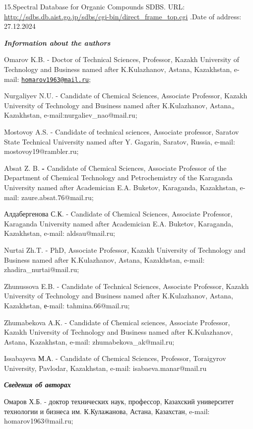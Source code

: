 15.Spectral Database for Organic Compounds SDBS. URL:
\url{http://sdbs.db.aist.go.jp/sdbs/cgi-bin/direct_frame_top.cgi} .Date
of address: 27.12.2024

\emph{{\bfseries Information about the authors}}

Omarov K.B. - Doctor of Technical Sciences, Professor, Kazakh University
of Technology and Business named after K.Kulazhanov, Astana, Kazakhstan,
e-mail:
\href{mailto:homarov1963@mail.ru}{\nolinkurl{homarov1963@mail.ru}};

Nurgaliyev N.U. - Candidate of Chemical Sciences, Associate Professor,
Kazakh University of Technology and Business named after K.Kulazhanov,
Astana„ Kazakhstan, e-mail:nurgaliev\_nao@mail.ru;

Mostovoy A.S. - Candidate of technical sciences, Associate professor,
Saratov State Technical University named after Y. Gagarin, Saratov,
Russia, e-mail: mostovoy19@rambler.ru;

Absat Z. B. {\bfseries -} Candidate of Chemical Sciences, Associate
Professor of the Department of Chemical Technology and Petrochemistry of
the Karaganda University named after Academician E.A. Buketov,
Karaganda, Kazakhstan, e-mail: zaure.absat.76@mail.ru;

Алдабергенова С.К. - Candidate of Chemical Sciences, Associate
Professor, Karaganda University named after Academician E.A. Buketov,
Karaganda, Kazakhstan, e-mail: aldsau@mail.ru;

Nurtai Zh.T. - PhD, Associate Professor, Kazakh University of Technology
and Business named after K.Kulazhanov, Astana, Kazakhstan, e-mail:
zhadira\_nurtai@mail.ru;

Zhunussova E.B. - Candidate of Technical Sciences, Associate Professor,
Kazakh University of Technology and Business named after K.Kulazhanov,
Astana, Kazakhstan, е-mail: tahmina.66@mail.ru;

Zhumabekova A.K. - Candidate of Chemical sciences, Associate Professor,
Kazakh University of Technology and Business named after K.Kulazhanov,
Astana, Kazakhstan, e-mail: zhumabekova\_ak@mail.ru;

Issabayeva М.А. - Candidate of Chemical Sciences, Professor, Toraigyrov
University, Pavlodar, Kazakhstan, e-mail: isabaeva.manar@mail.ru

\emph{{\bfseries Сведения об авторах}}

Омаров Х.Б. - доктор технических наук, профессор, Казахский университет
технологии и бизнеса им. К.Кулажанова, Астана, Казахстан, e-mail:
homarov1963@mail.ru;

